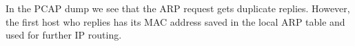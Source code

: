 In the PCAP dump we see that the ARP request gets duplicate replies.
However, the first host who replies has its MAC address saved in the local ARP table and used for further IP routing.

